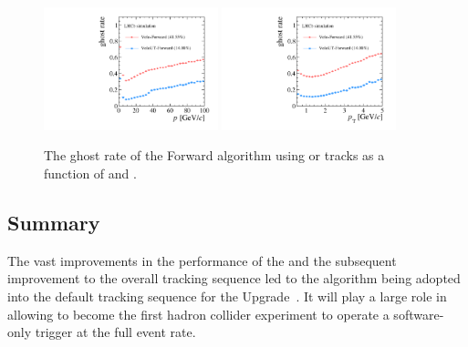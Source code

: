\begin{figure}[!htb]
\centering
\includegraphics[width=0.45\textwidth]{figs/upstream-tracking-upgrade/fwd_gr_p_comp.pdf}
\includegraphics[width=0.45\textwidth]{figs/upstream-tracking-upgrade/fwd_gr_pt_comp.pdf}
\caption{The ghost rate of the Forward algorithm using \velo or \velout tracks as a function of \ptot and \pt.}
\label{fig:gr_fwd_comp}
\end{figure}

\subsection{Summary}

The vast improvements in the performance of the \velout and the subsequent improvement to the overall tracking sequence led to the algorithm being adopted into the default tracking sequence for the \lhcb Upgrade~\cite{upgrade-tracker-tdr,upgrade-trigger-tdr}. It will play a large role in allowing \lhcb to become the first hadron collider experiment to operate a software-only trigger at the full event rate.

